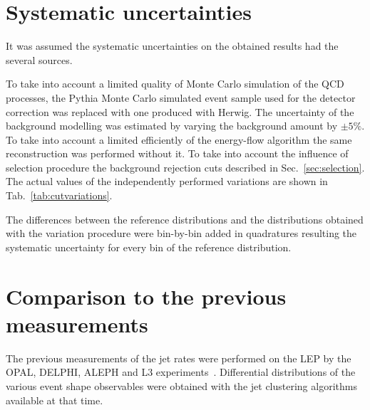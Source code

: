 






















\FloatBarrier
\section{Systematic uncertainties}
\label{sec:systematic}
It was assumed the
 systematic uncertainties on the obtained results 
 had the several sources.

 To take into account a limited quality of Monte Carlo simulation of the
 QCD processes, the Pythia Monte Carlo simulated event sample used for the detector
 correction was replaced with one produced with Herwig.
 The uncertainty of the background modelling was estimated by varying the 
 background amount by $\pm5\%$.
To take into account a limited efficiently of the energy-flow 
algorithm the same reconstruction was performed without it.
 To take into account the influence of selection procedure
the background rejection cuts described in Sec.~\ref{sec:selection}. %
 The actual values of the independently performed variations are shown in Tab.~\ref{tab:cutvariations}.
 \TABcutvariations
 
The differences between the reference distributions and the distributions obtained with 
the variation procedure were bin-by-bin added in quadratures resulting the systematic uncertainty for 
every bin of the reference distribution.
 


\section{Comparison to the previous measurements}                      
\label{sec:comparison}
The previous measurements of the jet rates were performed on the LEP by 
the OPAL, DELPHI, ALEPH and L3 experiments~\cite{Alexander:1996kh,
Ackerstaff:1997kk,Acton:1992fa,Akrawy:1989rg,Heister:2003aj,Abdallah:2003xz,Achard:2004sv}.
Differential distributions of the various event shape observables were 
obtained with the jet clustering algorithms available at that  time.
